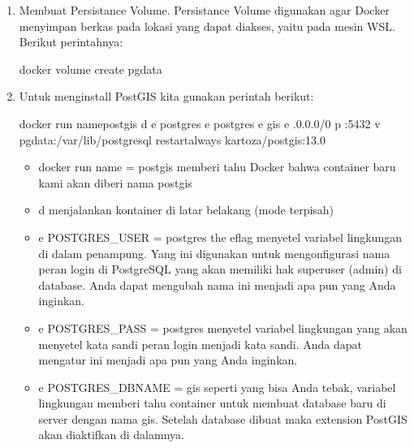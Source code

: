 \documentclass[letterpaper,10pt,english]{sphinxmanual}
\begin{document}
\begin{enumerate}
%
\item {} 
Membuat Persistance Volume.
Persistance Volume digunakan agar Docker menyimpan berkas pada lokasi yang dapat diakses, yaitu pada mesin WSL. Berikut perintahnya:

\begin{sphinxVerbatim}[commandchars=\\\{\}]
docker volume create pg\PYGZus{}data
\end{sphinxVerbatim}

\item {} 
Untuk menginstall PostGIS kita gunakan perintah berikut:

\begin{sphinxVerbatim}[commandchars=\\\{\}]
docker run \PYGZhy{}\PYGZhy{}namepostgis \PYGZhy{}d \PYGZhy{}e postgres \PYGZhy{}e postgres \PYGZhy{}e gis \PYGZhy{}e .0.0.0/0 \PYGZhy{}p :5432 \PYGZhy{}v pg\PYGZus{}data:/var/lib/postgresql \PYGZhy{}\PYGZhy{}restartalways kartoza/postgis:13.0
\end{sphinxVerbatim}
\begin{itemize}
\item {} 
docker run \textendash{}name = postgis memberi tahu Docker bahwa container baru kami akan diberi nama postgis

\item {} 
\sphinxhyphen{}d menjalankan kontainer di latar belakang (mode terpisah)

\item {} 
\sphinxhyphen{}e POSTGRES\_USER = postgres the \sphinxhyphen{}eflag menyetel variabel lingkungan di dalam penampung. Yang ini digunakan untuk mengonfigurasi nama peran login di PostgreSQL yang akan memiliki hak superuser (admin) di database. Anda dapat mengubah nama ini menjadi apa pun yang Anda inginkan.

\item {} 
\sphinxhyphen{}e POSTGRES\_PASS = postgres menyetel variabel lingkungan yang akan menyetel kata sandi peran login menjadi \textasciigrave{}kata sandi. Anda dapat mengatur ini menjadi apa pun yang Anda inginkan.

\item {} 
\sphinxhyphen{}e POSTGRES\_DBNAME = gis seperti yang bisa Anda tebak, variabel lingkungan memberi tahu container untuk membuat database baru di server dengan nama gis. Setelah database dibuat maka extension PostGIS akan diaktifkan di dalamnya.


\end{itemize}
\end{enumerate}
\end{document}
